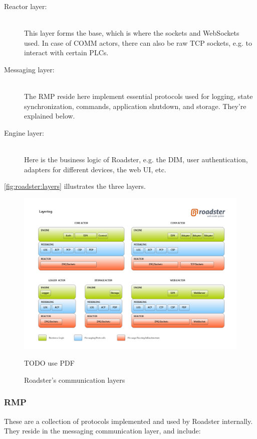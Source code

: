 \begin{description}
	\item [Reactor layer:]\hfill\\
		This layer forms the base, which is where the \zmq sockets and
		WebSockets used. In case of COMM actors, there can also be raw
		TCP sockets, e.g. to interact with certain \glspl{PLC}.

	\item [Messaging layer:]\hfill\\
		The \gls{RMP} reside here implement essential protocols used
		for logging, state synchronization, commands, application
		shutdown, and storage. They're explained below.

	\item [Engine layer:]\hfill\\
		Here is the business logic of Roadster, e.g. the \gls{DIM},
		user authentication, adapters for different devices, the web
		\gls{UI}, etc.
\end{description}


\autoref{fig:roadster:layers} illustrates the three layers.

\begin{figure}[!ht]
	\includegraphics[trim=2cm 2.5cm 1cm 2.8cm, clip=true, width=\textwidth]{img/roadster_layering.png}
	\caption{Roadster's communication layers}
	\label{fig:roadster:layers}
TODO use PDF
\end{figure}

\subsubsection{\gls{RMP}}
These are a collection of protocols implemented and used by Roadster
internally. They reside in the messaging communication layer, and include:

